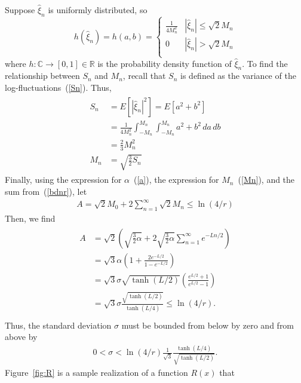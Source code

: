 Suppose $\hat{\xi}_n$ is uniformly distributed, so 
\begin{displaymath}\label{eq:square}
   h(\hat{\xi}_n) =h(a,b)= \left\{
     \begin{array}{lr}
       \frac{1}{4 M_n^2} & |\hat{\xi}_n| \leq \sqrt{2}M_n\\
       0 & |\hat{\xi}_n| > \sqrt{2}M_n\\
     \end{array}
   \right.
\end{displaymath} 
where $h:\mathbb{C}\to [0,1]\in \mathbb{R}$ is the probability density
function of $\hat{\xi}_n$. To find the relationship between $S_n$ and
$M_n$, recall that $S_n$ is defined as the variance of the
log-fluctuations~(\ref{Sn}). Thus, 
\begin{align}
\begin{split}\label{Mn}
S_n&=E[|\hat{\xi}_n|^2] = E[a^2+b^2]\\
 &= \frac{1}{4M_n^2}\int_{-M_n}^{M_n}\int_{-M_n}^{M_n}a^2+b^2\,da\,db\\
&=\frac{2}{3}M_n^2\\
M_n&=\sqrt{\frac{3}{2}S_n}
\end{split}
\end{align}
Finally, using the expression for $\alpha$~(\ref{a}), the
expression for $M_n$~(\ref{Mn}), and the sum from~(\ref{bdnr}), let
\begin{align*}
A = \sqrt{2}M_0+2\sum_{n=1}^\infty \sqrt{2}M_n \leq \ln(4/r)
\end{align*}
Then, we find
\begin{align*}
\begin{split}
A &=\sqrt{2}\left(\sqrt{\frac{3}{2}\alpha} +
2\sqrt{\frac{3}{2}\alpha}\sum_{n=1}^{\infty}e^{-Ln/2}\right) \\
&= \sqrt{3}\alpha\left(1+ \frac{2e^{-L/2}}{1-e^{-L/2}} \right)\\
&= \sqrt{3}\sigma
\sqrt{\tanh(L/2)}\left(\frac{e^{L/2}+1}{e^{L/2}-1} \right)\\
&= \sqrt{3}\sigma \frac{\sqrt{\tanh(L/2)}}{\tanh(L/4)} \leq \ln(4/r).\\
\end{split}
\end{align*}
Thus, the standard deviation $\sigma$ must be bounded from below by
zero and from above by
\begin{align}\label{sigma}
0<\sigma<\ln(4/r)\frac{1}{\sqrt{3}}\frac{\tanh(L/4)}{\sqrt{\tanh(L/2)}}.
\end{align}
Figure~\ref{fig:R} is a sample realization of a function $R(x)$ that
